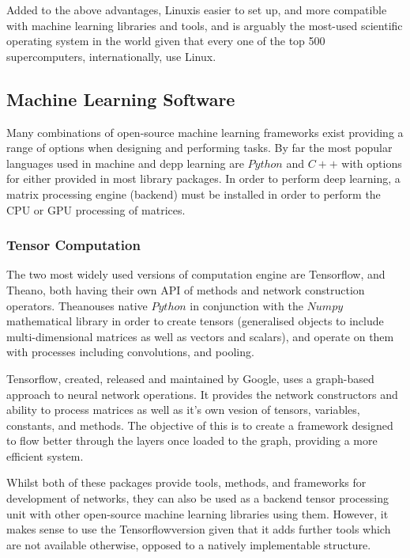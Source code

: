 \documentclass[fleqn,twoside]{article}
\begin{document}
Added to the above advantages, Linux\textregistered is easier to set up, and more compatible with machine learning libraries and tools, and is arguably the most-used scientific operating system in the world given that every one of the top 500 supercomputers, internationally, use Linux\textregistered.


\subsection{Machine Learning Software}


Many combinations of open-source machine learning frameworks exist providing a range of options when designing and performing tasks. By far the most popular languages used in machine and depp learning are $Python$ and $C++$ with options for either provided in most library packages. In order to perform deep learning, a matrix processing engine (backend) must be installed in order to perform the CPU or GPU processing of matrices.



\subsubsection{Tensor Computation}

The two most widely used versions of computation engine are Tensorflow\textregistered, and Theano\textregistered, both having their own API of methods and network construction operators. Theano\textregistered uses native $Python$ in conjunction with the $Numpy$ mathematical library in order to create tensors (generalised objects to include multi-dimensional matrices as well as vectors and scalars), and operate on them with processes including convolutions, and pooling.  

Tensorflow\textregistered, created, released and maintained by Google\textregistered, uses a graph-based approach to neural network operations. It provides the network constructors and ability to process matrices as well as it's own vesion of tensors, variables, constants, and methods. The objective of this is to create a framework designed to flow better through the layers once loaded to the graph, providing a more efficient system. 

Whilst both of these packages provide tools, methods, and frameworks for development of networks, they can also be used as a backend tensor processing unit with other open-source machine learning libraries using them. However, it makes sense to use the Tensorflow\textregistered version given that it adds further tools which are not available otherwise, opposed to a natively implementable structure.
\end{document}
